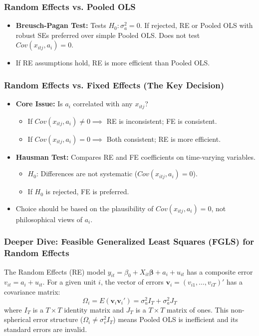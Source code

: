 \documentclass[a4paper, 10pt]{article}
\theoremstyle{definition}	%
\begin{document}
\subsubsection{Random Effects vs. Pooled OLS}
\begin{itemize}
    \item \textbf{Breusch-Pagan Test:} Tests \(H_0: \sigma_a^2 = 0\). If rejected, RE or Pooled OLS with robust SEs preferred over simple Pooled OLS. Does not test \(Cov(x_{itj}, a_i)=0\).
    \item If RE assumptions hold, RE is more efficient than Pooled OLS.
\end{itemize}

\subsubsection{Random Effects vs. Fixed Effects (The Key Decision)}
\begin{itemize}
    \item \textbf{Core Issue:} Is \(a_i\) correlated with any \(x_{itj}\)?
    \begin{itemize}
        \item If \(Cov(x_{itj}, a_i) \neq 0 \implies\) RE is inconsistent; FE is consistent.
        \item If \(Cov(x_{itj}, a_i) = 0 \implies\) Both consistent; RE is more efficient.
    \end{itemize}
    \item \textbf{Hausman Test:} Compares RE and FE coefficients on time-varying variables.
    \begin{itemize}
        \item \(H_0\): Differences are not systematic (\(Cov(x_{itj}, a_i)=0\)).
        \item If \(H_0\) is rejected, FE is preferred.
    \end{itemize}
    \item Choice should be based on the plausibility of \(Cov(x_{itj}, a_i)=0\), not philosophical views of \(a_i\).
\end{itemize}

\subsubsection{Deeper Dive: Feasible Generalized Least Squares (FGLS) for Random Effects}
The Random Effects (RE) model \(y_{it} = \beta_0 + X_{it}\boldsymbol{\beta} + a_i + u_{it}\) has a composite error \(v_{it} = a_i + u_{it}\). For a given unit \(i\), the vector of errors \(\mathbf{v}_i = (v_{i1}, \dots, v_{iT})'\) has a covariance matrix:
\[ \Omega_i = E(\mathbf{v}_i \mathbf{v}_i') = \sigma_u^2 I_T + \sigma_a^2 J_T \]
where \(I_T\) is a \(T \times T\) identity matrix and \(J_T\) is a \(T \times T\) matrix of ones. This non-spherical error structure (\(\Omega_i \neq \sigma_v^2 I_T\)) means Pooled OLS is inefficient and its standard errors are invalid.
\end{document}
